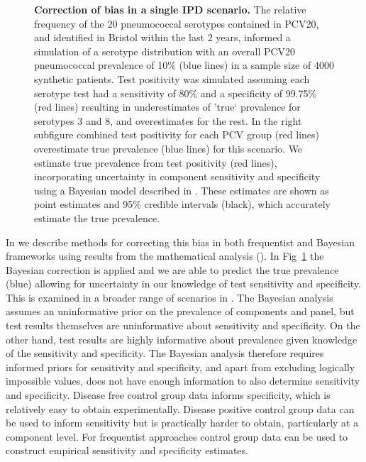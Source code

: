 \documentclass[10pt,letterpaper]{article}
\begin{document}
\begin{figure}[hb!]
\caption{{\bf Correction of bias in a single IPD scenario.}
The relative frequency of the 20 pneumococcal serotypes contained in PCV20, and identified in Bristol within the last 2 years, informed a simulation of a serotype distribution with an overall PCV20 pneumococcal prevalence of 10\% (blue lines) in a sample size of 4000 synthetic patients. Test positivity was simulated assuming each serotype test had a sensitivity of 80\% and a specificity of 99.75\% (red lines) resulting in underestimates of 'true` prevalence for serotypes 3 and 8, and overestimates for the rest. In the right subfigure combined test positivity for each PCV group (red lines) overestimate true prevalence (blue lines) for this scenario. We estimate true prevalence from test positivity (red lines), incorporating uncertainty in component sensitivity and specificity using a Bayesian model described in . These estimates are shown as point estimates and 95\% credible intervals (black), which accurately estimate the true prevalence.}
\label{fig5}
\end{figure}

In  we describe methods for correcting this bias in both frequentist and Bayesian frameworks using results from the mathematical analysis (). In Fig~\ref{fig5} the Bayesian correction is applied and we are able to predict the true prevalence (blue) allowing for uncertainty in our knowledge of test sensitivity and specificity. This is examined in a broader range of scenarios in . The Bayesian analysis assumes an uninformative prior on the prevalence of components and panel, but test results themselves are uninformative about sensitivity and specificity. On the other hand, test results are highly informative about prevalence given knowledge of the sensitivity and specificity. The Bayesian analysis therefore requires informed priors for sensitivity and specificity, and apart from excluding logically impossible values, does not have enough information to also determine sensitivity and specificity. Disease free control group data informs specificity, which is relatively easy to obtain experimentally. Disease positive control group data can be used to inform sensitivity but is practically harder to obtain, particularly at a component level. For frequentist approaches control group data can be used to construct empirical sensitivity and specificity estimates.
\end{document}
